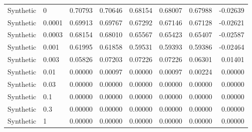 \begin{tabular}{llrrrrrr}
\midrule
Synthetic & 0 & 0.70793 & 0.70646 & 0.68154 & 0.68007 & 0.67988 & -0.02639\\
Synthetic & 0.0001 & 0.69913 & 0.69767 & 0.67292 & 0.67146 & 0.67128 & -0.02621\\
Synthetic & 0.0003 & 0.68154 & 0.68010 & 0.65567 & 0.65423 & 0.65407 & -0.02587\\
Synthetic & 0.001 & 0.61995 & 0.61858 & 0.59531 & 0.59393 & 0.59386 & -0.02464\\
Synthetic & 0.003 & 0.05826 & 0.07203 & 0.07226 & 0.07226 & 0.06301 & 0.01401\\
Synthetic & 0.01 & 0.00000 & 0.00097 & 0.00000 & 0.00097 & 0.00224 & 0.00000\\
Synthetic & 0.03 & 0.00000 & 0.00000 & 0.00000 & 0.00000 & 0.00000 & 0.00000\\
Synthetic & 0.1 & 0.00000 & 0.00000 & 0.00000 & 0.00000 & 0.00000 & 0.00000\\
Synthetic & 0.3 & 0.00000 & 0.00000 & 0.00000 & 0.00000 & 0.00000 & 0.00000\\
Synthetic & 1 & 0.00000 & 0.00000 & 0.00000 & 0.00000 & 0.00000 & 0.00000\\
\bottomrule
\end{tabular}
